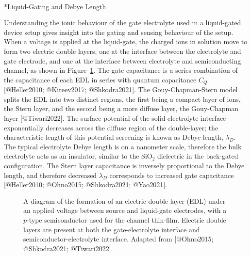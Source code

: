 \documentclass[
  letterpaper,
  DIV=11,
  numbers=noendperiod]{scrartcl}
\makeatletter
\let\oldparagraph\paragraph
\renewcommand{\paragraph}{
    \@ifstar
      \xxxParagraphStar
      \xxxParagraphNoStar
  }
\newcommand{\xxxParagraphStar}[1]{\oldparagraph*{#1}\mbox{}}
\newcommand{\xxxParagraphNoStar}[1]{\oldparagraph{#1}\mbox{}}
\makeatother
\begin{document}
\paragraph*{Liquid-Gating and Debye
Length}\label{liquid-gating-and-debye-length}

Understanding the ionic behaviour of the gate electrolyte used in a
liquid-gated device setup gives insight into the gating and sensing
behaviour of the setup. When a voltage is applied at the liquid-gate,
the charged ions in solution move to form two electric double layers,
one at the interface between the electrolyte and gate electrode, and one
at the interface between electrolyte and semiconducting channel, as
shown in Figure~\ref{fig-Debye-length}. The gate capacitance is a series
combination of the capacitance of each EDL in series with quantum
capacitance \(C_{Q}\) {[}@Heller2010; @Kireev2017; @Shkodra2021{]}. The
Gouy-Chapman-Stern model splits the EDL into two distinct regions, the
first being a compact layer of ions, the Stern layer, and the second
being a more diffuse layer, the Gouy-Chapman layer {[}@Tiwari2022{]}.
The surface potential of the solid-electrolyte interface exponentially
decreases across the diffuse region of the double-layer; the
characteristic length of this potential screening is known as Debye
length, \(\lambda_D\). The typical electrolyte Debye length is on a
nanometer scale, therefore the bulk electrolyte acts as an insulator,
similar to the SiO\(_2\) dielectric in the back-gated configuration. The
Stern layer capacitance is inversely proportional to the Debye length,
and therefore decreased \(\lambda_D\) corresponds to increased gate
capacitance {[}@Heller2010; @Ohno2015; @Shkodra2021; @Yao2021{]}.

\begin{figure}


\caption{\label{fig-Debye-length}A diagram of the formation of an
electric double layer (EDL) under an applied voltage between source and
liquid-gate electrodes, with a \(p\)-type semiconductor used for the
channel thin-film. Electric double layers are present at both the
gate-electrolyte interface and semiconductor-electrolyte interface.
Adapted from {[}@Ohno2015; @Shkodra2021; @Tiwari2022{]}.}

\end{figure}%
\end{document}
